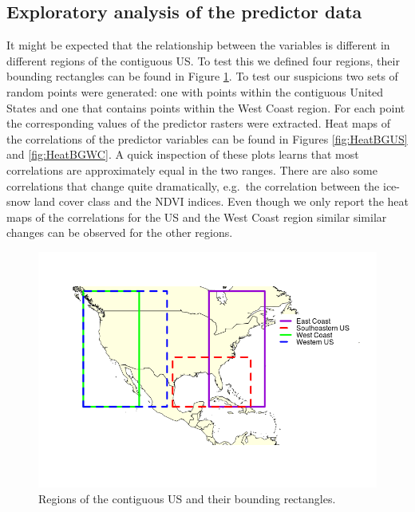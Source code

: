 \subsection{Exploratory analysis of the predictor data}
\label{sec:ExploratoryPredictor}
It might be expected that the relationship between the variables is different in different regions of the contiguous US. To test this we defined four regions, their bounding rectangles can be found in Figure \ref{fig:studyExtent}. To test our suspicions two sets of random points were generated: one with points within the contiguous United States and one that contains points within the West Coast region. For each point the corresponding values of the predictor rasters were extracted. Heat maps of the correlations of the predictor variables can be found in Figures \ref{fig:HeatBGUS} and \ref{fig:HeatBGWC}. A quick inspection of these plots learns that most correlations are approximately equal in the two ranges. There are also some correlations that change quite dramatically, e.g.\ the correlation between the ice-snow land cover class and the NDVI indices. Even though we only report the heat maps of the correlations for the US and the West Coast region similar similar changes can be observed for the other regions. \\

\begin{figure}[!htb]
\centering
\includegraphics[scale=0.6]{Plots/StudyExtent.png}
\caption{\label{fig:studyExtent}Regions of the contiguous US and their bounding rectangles.}
\end{figure}



